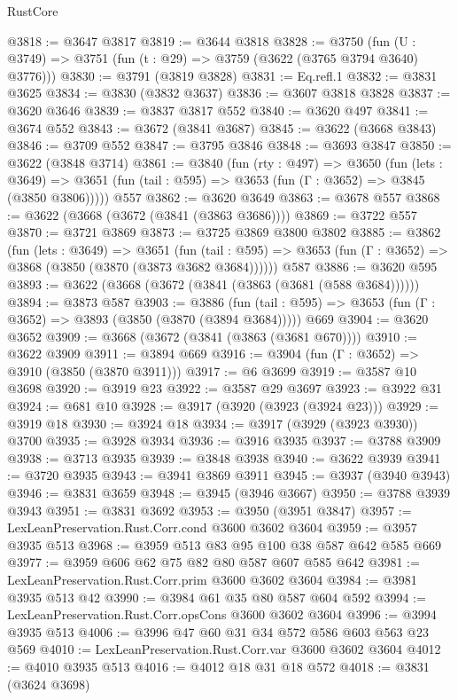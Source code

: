 \begin{lexlean}{RustCore}
\begin{coremodule}
@3818 := @3647 @3817
@3819 := @3644 @3818
@3828 := @3750 (fun (U : @3749) => @3751 (fun (t : @29) => @3759 (@3622 (@3765 @3794 @3640) @3776)))
@3830 := @3791 (@3819 @3828)
@3831 := Eq.refl.{1}
@3832 := @3831 @3625
@3834 := @3830 (@3832 @3637)
@3836 := @3607 @3818 @3828
@3837 := @3620 @3646
@3839 := @3837 @3817 @552
@3840 := @3620 @497
@3841 := @3674 @552
@3843 := @3672 (@3841 @3687)
@3845 := @3622 (@3668 @3843)
@3846 := @3709 @552
@3847 := @3795 @3846
@3848 := @3693 @3847
@3850 := @3622 (@3848 @3714)
@3861 := @3840
    (fun (rty : @497) =>
    @3650
      (fun (lets : @3649) =>
      @3651 (fun (tail : @595) => @3653 (fun (Γ : @3652) => @3845 (@3850 @3806)))))
    @557
@3862 := @3620 @3649
@3863 := @3678 @557
@3868 := @3622 (@3668 (@3672 (@3841 (@3863 @3686))))
@3869 := @3722 @557
@3870 := @3721 @3869
@3873 := @3725 @3869 @3800 @3802
@3885 := @3862
    (fun (lets : @3649) =>
    @3651
      (fun (tail : @595) => @3653 (fun (Γ : @3652) => @3868 (@3850 (@3870 (@3873 @3682 @3684))))))
    @587
@3886 := @3620 @595
@3893 := @3622 (@3668 (@3672 (@3841 (@3863 (@3681 (@588 @3684))))))
@3894 := @3873 @587
@3903 := @3886
    (fun (tail : @595) => @3653 (fun (Γ : @3652) => @3893 (@3850 (@3870 (@3894 @3684)))))
    @669
@3904 := @3620 @3652
@3909 := @3668 (@3672 (@3841 (@3863 (@3681 @670))))
@3910 := @3622 @3909
@3911 := @3894 @669
@3916 := @3904 (fun (Γ : @3652) => @3910 (@3850 (@3870 @3911)))
@3917 := @6 @3699
@3919 := @3587 @10 @3698
@3920 := @3919 @23
@3922 := @3587 @29 @3697
@3923 := @3922 @31
@3924 := @681 @10
@3928 := @3917 (@3920 (@3923 (@3924 @23)))
@3929 := @3919 @18
@3930 := @3924 @18
@3934 := @3917 (@3929 (@3923 @3930)) @3700
@3935 := @3928 @3934
@3936 := @3916 @3935
@3937 := @3788 @3909
@3938 := @3713 @3935
@3939 := @3848 @3938
@3940 := @3622 @3939
@3941 := @3720 @3935
@3943 := @3941 @3869 @3911
@3945 := @3937 (@3940 @3943)
@3946 := @3831 @3659
@3948 := @3945 (@3946 @3667)
@3950 := @3788 @3939 @3943
@3951 := @3831 @3692
@3953 := @3950 (@3951 @3847)
@3957 := LexLeanPreservation.Rust.Corr.cond @3600 @3602 @3604
@3959 := @3957 @3935 @513
@3968 := @3959 @513 @83 @95 @100 @38 @587 @642 @585 @669
@3977 := @3959 @606 @62 @75 @82 @80 @587 @607 @585 @642
@3981 := LexLeanPreservation.Rust.Corr.prim @3600 @3602 @3604
@3984 := @3981 @3935 @513 @42
@3990 := @3984 @61 @35 @80 @587 @604 @592
@3994 := LexLeanPreservation.Rust.Corr.opsCons @3600 @3602 @3604
@3996 := @3994 @3935 @513
@4006 := @3996 @47 @60 @31 @34 @572 @586 @603 @563 @23 @569
@4010 := LexLeanPreservation.Rust.Corr.var @3600 @3602 @3604
@4012 := @4010 @3935 @513
@4016 := @4012 @18 @31 @18 @572
@4018 := @3831 (@3624 @3698)

\end{coremodule}
\end{lexlean}
